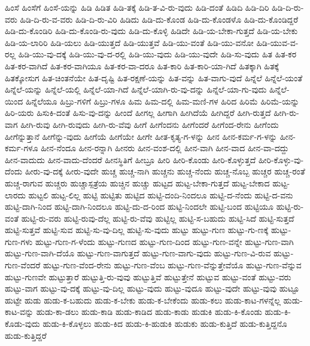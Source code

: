 {ಹಿಂಸೆ
ಹಿಂಸೆಗೆ
ಹಿಂಸೆ-ಯನ್ನು
ಹಿಡಿ
ಹಿಡಿತ
ಹಿಡಿ-ತಕ್ಕೆ
ಹಿಡಿ-ತ-ವಿ-ರು-ವುದು
ಹಿಡಿ-ದಂತೆ
ಹಿಡಿದಿ
ಹಿಡಿ-ದಿರಿ
ಹಿಡಿ-ದಿ-ರು-ವರು
ಹಿಡಿ-ದಿ-ರು-ವ-ವರು
ಹಿಡಿ-ದಿ-ರು-ವಿರಿ
ಹಿಡಿದು
ಹಿಡಿ-ದು-ಕೊಂಡ
ಹಿಡಿ-ದು-ಕೊಂಡಳೊ
ಹಿಡಿ-ದು-ಕೊಂಡಿದ್ದರೆ
ಹಿಡಿ-ದು-ಕೊಂಡಿರಿ
ಹಿಡಿ-ದು-ಕೊಂಡಿ-ರು-ವುದು
ಹಿಡಿ-ದು-ಕೊಳ್ಳಿ
ಹಿಡಿದೇ
ಹಿಡಿ-ಯ-ಬೇಕಾ-ಗುತ್ತದೆ
ಹಿಡಿ-ಯ-ಬೇಕು
ಹಿಡಿ-ಯ-ಲಾರಿರಿ
ಹಿಡಿ-ಯಲು
ಹಿಡಿ-ಯುತ್ತದೆ
ಹಿಡಿ-ಯುತ್ತವೆ
ಹಿಡಿ-ಯು-ವಂತೆ
ಹಿಡಿ-ಯು-ವನೋ
ಹಿಡಿ-ಯುವ-ವ-ರಲ್ಲ
ಹಿಡಿ-ಯು-ವು-ದಕ್ಕೆ
ಹಿಡಿ-ಯು-ವು-ದ-ರಲ್ಲಿ
ಹಿಡಿ-ಯು-ವುದು
ಹಿಡಿ-ಯು-ವುದೇ
ಹಿಡಿ-ಸು-ವುದು
ಹಿತ
ಹಿತ-ಕರ
ಹಿತ-ಕರ-ವಾಗಿದೆ
ಹಿತ-ಕರ-ವಾಗಿಯೂ
ಹಿತ-ಕರ-ವಾ-ದರೂ
ಹಿತ-ಕಾರಿ
ಹಿತ-ಕಾರಿ-ಯಾ-ಗಿದೆ
ಹಿತಕ್ಕಾಗಿ
ಹಿತಕ್ಕೆ
ಹಿತಕ್ಕೋಸುಗ
ಹಿತ-ಚಿಂತನೆಯೇ
ಹಿತ-ದೃಷ್ಟಿ
ಹಿತ-ರಕ್ಷಣೆ-ಯನ್ನು
ಹಿತ-ವನ್ನು
ಹಿತ-ವಾಗು-ವುದೆ
ಹಿನ್ನೆಲೆ
ಹಿನ್ನೆಲೆ-ಯಂತೆ
ಹಿನ್ನೆಲೆ-ಯನ್ನು
ಹಿನ್ನೆಲೆ-ಯಲ್ಲಿ
ಹಿನ್ನೆಲೆ-ಯಾ-ಗಿದೆ
ಹಿನ್ನೆಲೆ-ಯಾಗಿ-ರು-ವು-ದನ್ನು
ಹಿನ್ನೆಲೆ-ಯಾ-ಗು-ವುದು
ಹಿನ್ನೆಲೆ-ಯಿಂದ
ಹಿನ್ನೆಲೆಯೂ
ಹಿಬ್ರು-ಗಳಿಗೆ
ಹಿಬ್ರು-ಗಳೂ
ಹಿಮ
ಹಿಮ-ದಲ್ಲಿ
ಹಿಮ-ಮಣಿ-ಗಳ
ಹಿರಿದ
ಹಿರಿಮೆ
ಹಿರಿಮೆ-ಯನ್ನು
ಹಿರಿ-ಯರು
ಹಿಸುಕಿ-ದಂತೆ
ಹಿಸು-ವು-ದನ್ನು
ಹೀಂದೆ
ಹೀಗಲ್ಲ
ಹೀಗಾಗಿ
ಹೀಗಿದೆಯೆ
ಹೀಗಿದ್ದರೆ
ಹೀಗಿ-ರುತ್ತದೆ
ಹೀಗಿ-ರು-ವಾಗ
ಹೀಗಿ-ರುವು
ಹೀಗಿ-ರುವುದು
ಹೀಗಿ-ರು-ವೆವು
ಹೀಗೆ
ಹೀಗೆಂದನು
ಹೀಗೆಂದರೆ
ಹೀಗೆಂದ-ರೇನು
ಹೀಗೆಂದು
ಹೀಗೆನ್ನುತ್ತಾನೆ
ಹೀಗೆನ್ನು-ವುದು
ಹೀಗೆಯೆ
ಹೀಗೆಯೇ
ಹೀಗೇ
ಹೀತ-ಕೃತ್ಯ-ಗ-ಳನ್ನು
ಹೀನ
ಹೀನ-ಕರ್ಮ-ಗ-ಳನ್ನು
ಹೀನ-ಕರ್ಮ-ಗಳೂ
ಹೀನ-ನೆಂದೂ
ಹೀನ-ರನ್ನಾಗಿ
ಹೀನರು
ಹೀನ-ವಂಶ-ದಲ್ಲಿ
ಹೀನ-ವಾಗಿ
ಹೀನ-ವಾದ
ಹೀನ-ವಾ-ದದ್ದು
ಹೀನ-ವಾದುದು
ಹೀನ-ವಾದು-ದೆಂದರೆ
ಹೀನಸ್ಥಿತಿಗೆ
ಹೀಬ್ರೂ
ಹೀರಿ
ಹೀರಿ-ಕೊಂಡು
ಹೀರಿ-ಕೊಳ್ಳುತ್ತದೆ
ಹೀರಿ-ಕೊಳ್ಳು-ವು-ದೆಂದು
ಹೀರು-ವು-ದಕ್ಕೆ
ಹೀರು-ವುದೇ
ಹುಚ್ಚ
ಹುಚ್ಚ-ನಾಗಿ
ಹುಚ್ಚನು
ಹುಚ್ಚ-ನೆಂದು
ಹುಚ್ಚ-ನೊಬ್ಬ
ಹುಚ್ಚರ
ಹುಚ್ಚ-ರಂತೆ
ಹುಚ್ಚ-ರಾಗುವ
ಹುಚ್ಚರು
ಹುಚ್ಚಾಸ್ಪತ್ರೆಯ
ಹುಚ್ಚಿನ
ಹುಚ್ಚು
ಹುಟ್ಟದ
ಹುಟ್ಟ-ಬೇಕಾ-ಗುತ್ತದೆ
ಹುಟ್ಟ-ಬೇಕಾದ
ಹುಟ್ಟ-ಲಾರದು
ಹುಟ್ಟಲಿ
ಹುಟ್ಟ-ಲಿಲ್ಲ
ಹುಟ್ಟಿ
ಹುಟ್ಟಿತು
ಹುಟ್ಟಿದ
ಹುಟ್ಟಿ-ದಂದಿ-ನಿಂದಲೂ
ಹುಟ್ಟಿ-ದ-ನೆಂದು
ಹುಟ್ಟಿ-ದ-ವನು
ಹುಟ್ಟಿ-ದಾಗಿ-ನಿಂದ
ಹುಟ್ಟಿ-ದಾಗಿ-ನಿಂದಲೂ
ಹುಟ್ಟಿ-ದು-ದ-ರಿಂದ
ಹುಟ್ಟಿ-ನಿಂದಲೇ
ಹುಟ್ಟಿ-ಬಂದ
ಹುಟ್ಟಿಯೂ
ಹುಟ್ಟಿ-ರು-ವಂತೆ
ಹುಟ್ಟಿ-ರು-ವರು
ಹುಟ್ಟಿ-ರುವು-ದೆಲ್ಲ
ಹುಟ್ಟಿ-ರು-ವೆವು
ಹುಟ್ಟಿಲ್ಲ
ಹುಟ್ಟಿ-ಸ-ಬಹುದು
ಹುಟ್ಟಿ-ಸಿದೆ
ಹುಟ್ಟಿ-ಸುತ್ತದೆ
ಹುಟ್ಟಿ-ಸುತ್ತವೆ
ಹುಟ್ಟಿ-ಸುವ
ಹುಟ್ಟಿ-ಸು-ವು-ದಿಲ್ಲ
ಹುಟ್ಟಿ-ಸು-ವುದು
ಹುಟ್ಟು
ಹುಟ್ಟು-ಗುಣ
ಹುಟ್ಟು-ಗು-ಣಕ್ಕೆ
ಹುಟ್ಟು-ಗುಣ-ಗಳು
ಹುಟ್ಟು-ಗುಣ-ಗ-ಳೆಂದು
ಹುಟ್ಟು-ಗುಣದ
ಹುಟ್ಟು-ಗುಣ-ದಿಂದ
ಹುಟ್ಟು-ಗುಣ-ವನ್ನೇ
ಹುಟ್ಟು-ಗುಣ-ವಾಗಿ
ಹುಟ್ಟು-ಗುಣ-ವಾಗಿ-ದೆಯೊ
ಹುಟ್ಟು-ಗುಣ-ವಾಗುತ್ತದೆ
ಹುಟ್ಟು-ಗುಣ-ವಾಗು-ವುದು
ಹುಟ್ಟು-ಗುಣ-ವಿ-ರುವ
ಹುಟ್ಟು-ಗುಣ-ವೆಂದರೆ
ಹುಟ್ಟು-ಗುಣ-ವೆಂದ-ರೇನು
ಹುಟ್ಟು-ಗುಣ-ವೆಂಬ
ಹುಟ್ಟು-ಗುಣ-ವೆನ್ನುತ್ತೇವೆಯೊ
ಹುಟ್ಟು-ಗುಣ-ವೆನ್ನುವ
ಹುಟ್ಟು-ಗುಣವೇ
ಹುಟ್ಟುತ್ತಾರೆ
ಹುಟ್ಟುತ್ತಿ-ರು-ವುವು
ಹುಟ್ಟುತ್ತಿವೆ
ಹುಟ್ಟುತ್ತೇನೆ
ಹುಟ್ಟುವ
ಹುಟ್ಟು-ವಂತೆ
ಹುಟ್ಟು-ವರು
ಹುಟ್ಟು-ವಾಗ
ಹುಟ್ಟು-ವು-ದಕ್ಕೆ
ಹುಟ್ಟು-ವು-ದಿಲ್ಲ
ಹುಟ್ಟು-ವುದು
ಹುಟ್ಟು-ವುದೂ
ಹುಟ್ಟು-ವುದೇ
ಹುಟ್ಟು-ವುವು
ಹುಟ್ಟೂ
ಹುಟ್ಟೇ
ಹುಡು
ಹುಡು-ಕ-ಬಹುದು
ಹುಡು-ಕ-ಬೇಕು
ಹುಡು-ಕ-ಬೇಕೆಂದು
ಹುಡು-ಕಲು
ಹುಡು-ಕಾಟ-ಗಳನ್ನೆಲ್ಲ
ಹುಡು-ಕಾಟ-ವನ್ನು
ಹುಡು-ಕಾ-ಡಲು
ಹುಡು-ಕಾಡಿ
ಹುಡು-ಕಾಡಿದ
ಹುಡು-ಕಾಡು
ಹುಡುಕಿ
ಹುಡು-ಕಿ-ಕೊಂಡು
ಹುಡು-ಕಿ-ಕೊಡು-ವುದು
ಹುಡು-ಕಿ-ಕೊಳ್ಳಲು
ಹುಡು-ಕಿದ
ಹುಡು-ಕಿ-ಹುಡುಕಿ
ಹುಡುಕು
ಹುಡು-ಕುತ್ತಿದೆ
ಹುಡು-ಕುತ್ತಿದ್ದನೊ
ಹುಡು-ಕುತ್ತಿದ್ದರೆ
}
